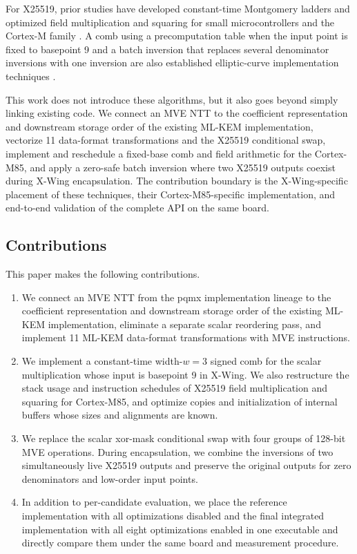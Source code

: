 \documentclass[runningheads,orivec]{llncs}
\newcommand{\xwing}{X-Wing}
\begin{document}
For X25519, prior studies have developed constant-time Montgomery ladders and
optimized field multiplication and squaring for small microcontrollers and the
Cortex-M family \cite{RFC7748,Lenngren,FujiiAranha17,DullEtAl15}. A comb using a
precomputation table when the input point is fixed to basepoint 9 and a batch
inversion that replaces several denominator inversions with one inversion are
also established elliptic-curve implementation techniques \cite{GuideECC04}.

This work does not introduce these algorithms, but it also goes beyond simply
linking existing code. We connect an MVE NTT to the coefficient representation
and downstream storage order of the existing ML-KEM implementation, vectorize
11 data-format transformations and the X25519 conditional swap, implement and
reschedule a fixed-base comb and field arithmetic for the Cortex-M85, and apply
a zero-safe batch inversion where two X25519 outputs coexist during \xwing{}
encapsulation. The contribution boundary is the \xwing{}-specific placement of
these techniques, their Cortex-M85-specific implementation, and end-to-end
validation of the complete API on the same board.

\subsection{Contributions}

This paper makes the following contributions.
\begin{enumerate}[leftmargin=*,itemsep=2pt]
\item We connect an MVE NTT from the pqmx implementation lineage to the
      coefficient representation and downstream storage order of the existing
      ML-KEM implementation, eliminate a separate scalar reordering pass, and
      implement 11 ML-KEM data-format transformations with MVE instructions.
\item We implement a constant-time width-$w=3$ signed comb for the scalar
      multiplication whose input is basepoint 9 in \xwing{}. We also restructure
      the stack usage and instruction schedules of X25519 field multiplication
      and squaring for Cortex-M85, and optimize copies and initialization of
      internal buffers whose sizes and alignments are known.
\item We replace the scalar xor-mask conditional swap with four groups of
      128-bit MVE operations. During encapsulation, we combine the inversions of
      two simultaneously live X25519 outputs and preserve the original outputs
      for zero denominators and low-order input points.
\item In addition to per-candidate evaluation, we place the reference
      implementation with all optimizations disabled and the final integrated
      implementation with all eight optimizations enabled in one executable and
      directly compare them under the same board and measurement procedure.
\end{enumerate}
\end{document}

